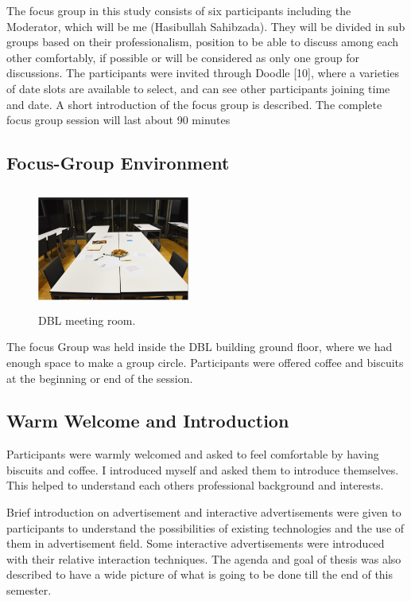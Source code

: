 The focus group in this study consists of six participants including the Moderator, which will be me (Hasibullah Sahibzada). They will be divided in sub groups based on their professionalism, position to be able to discuss among each other comfortably, if possible or will be considered as only one group for discussions.
The participants were invited through Doodle [10], where a varieties of date slots are available to select, and can see other participants joining time and date. A short introduction of the focus group is described. The complete focus group session will last about 90 minutes

\subsection{Focus-Group Environment}

\begin{figure} %
    \centering
\includegraphics[width=50mm,height=40mm]{Figures/4/meeting_room}
\caption{DBL meeting room.}
\label{fig:meeting_room}
\end{figure} 

The focus Group was held inside the DBL building ground floor, where we had enough space to make a group circle. Participants were offered coffee and biscuits at the beginning or end of the session.


\subsection{Warm Welcome and Introduction}
Participants were warmly welcomed and asked to feel comfortable by having biscuits and coffee. I introduced myself and asked them to introduce themselves. This helped to understand each others professional background and interests. 

Brief introduction on advertisement and interactive advertisements were given to participants to understand the possibilities of existing technologies and the use of them in advertisement field. Some interactive advertisements were introduced with their relative interaction techniques. The agenda and goal of thesis was also described to have a wide picture of what is going to be done till the end of this semester.

